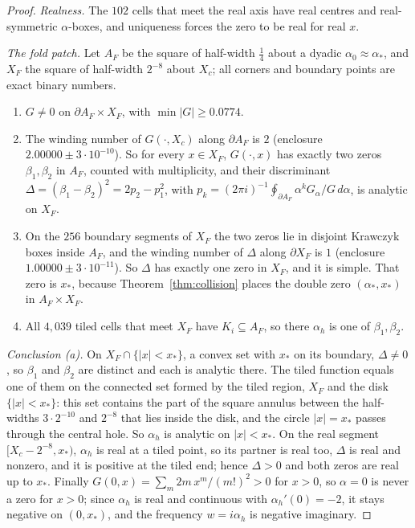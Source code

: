 \begin{proof}
\emph{Realness.} The $102$ cells that meet the real axis have real centres and real-symmetric $\alpha$-boxes, and uniqueness forces the zero to be real for real $x$.

\emph{The fold patch.} Let $A_F$ be the square of half-width $\frac14$ about a dyadic $\alpha_0\approx\alpha_*$, and $X_F$ the square of half-width $2^{-8}$ about $X_c$; all corners and boundary points are exact binary numbers.
\begin{enumerate}[label=(F\alph*)]
\item $G\ne0$ on $\partial A_F\times X_F$, with $\min|G|\ge0.0774$.
\item The winding number of $G(\cdot,X_c)$ along $\partial A_F$ is $2$ (enclosure $2.00000\pm3\cdot10^{-10}$). So for every $x\in X_F$, $G(\cdot,x)$ has exactly two zeros $\beta_1,\beta_2$ in $A_F$, counted with multiplicity, and their discriminant $\Delta=(\beta_1-\beta_2)^2=2p_2-p_1^2$, with $p_k=(2\pi i)^{-1}\oint_{\partial A_F}\alpha^kG_\alpha/G\,d\alpha$, is analytic on $X_F$.
\item On the $256$ boundary segments of $X_F$ the two zeros lie in disjoint Krawczyk boxes inside $A_F$, and the winding number of $\Delta$ along $\partial X_F$ is $1$ (enclosure $1.00000\pm3\cdot10^{-11}$). So $\Delta$ has exactly one zero in $X_F$, and it is simple. That zero is $x_*$, because Theorem~\ref{thm:collision} places the double zero $(\alpha_*,x_*)$ in $A_F\times X_F$.
\item All $4{,}039$ tiled cells that meet $X_F$ have $K_i\subseteq A_F$, so there $\alpha_h$ is one of $\beta_1,\beta_2$.
\end{enumerate}

\emph{Conclusion (a).} On $X_F\cap\{|x|<x_*\}$, a convex set with $x_*$ on its boundary, $\Delta\ne0$, so $\beta_1$ and $\beta_2$ are distinct and each is analytic there. The tiled function equals one of them on the connected set formed by the tiled region, $X_F$ and the disk $\{|x|<x_*\}$: this set contains the part of the square annulus between the half-widths $3\cdot2^{-10}$ and $2^{-8}$ that lies inside the disk, and the circle $|x|=x_*$ passes through the central hole. So $\alpha_h$ is analytic on $|x|<x_*$. On the real segment $[X_c-2^{-8},x_*)$, $\alpha_h$ is real at a tiled point, so its partner is real too, $\Delta$ is real and nonzero, and it is positive at the tiled end; hence $\Delta>0$ and both zeros are real up to $x_*$. Finally $G(0,x)=\sum_m2m\,x^m/(m!)^2>0$ for $x>0$, so $\alpha=0$ is never a zero for $x>0$; since $\alpha_h$ is real and continuous with $\alpha_h'(0)=-2$, it stays negative on $(0,x_*)$, and the frequency $w=i\alpha_h$ is negative imaginary.


\end{proof}
